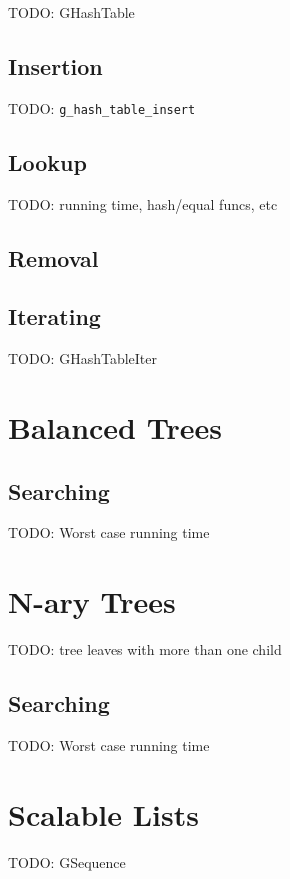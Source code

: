 TODO: GHashTable

\subsection{Insertion}

TODO: \verb|g_hash_table_insert|

\subsection{Lookup}

TODO: running time, hash/equal funcs, etc

\subsection{Removal}

\subsection{Iterating}

TODO: GHashTableIter

\section{Balanced Trees}
\subsection{Searching}

TODO: Worst case running time

\section{N-ary Trees}

TODO: tree leaves with more than one child

\subsection{Searching}

TODO: Worst case running time

\section{Scalable Lists}

TODO: GSequence
